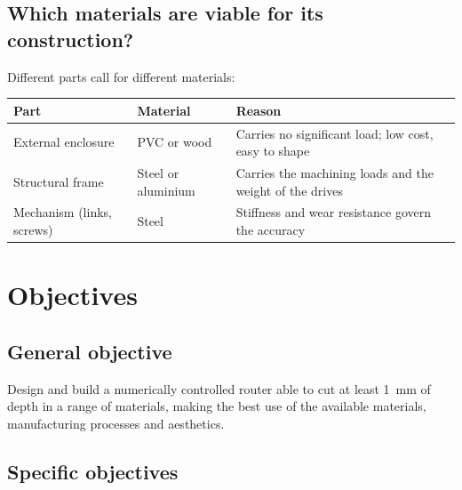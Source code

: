 \documentclass[11pt]{article}
\begin{document}
\subsection{Which materials are viable for its construction?}

Different parts call for different materials:

\begin{center}
\begin{tabular}{@{}l>{\raggedright\arraybackslash}p{4.0cm}>{\raggedright\arraybackslash}p{8.4cm}@{}}
\toprule
\textbf{Part} & \textbf{Material} & \textbf{Reason} \\
\midrule
External enclosure & PVC or wood & Carries no significant load; low cost, easy to shape \\
Structural frame   & Steel or aluminium & Carries the machining loads and the weight of the drives \\
Mechanism (links, screws) & Steel & Stiffness and wear resistance govern the accuracy \\
\bottomrule
\end{tabular}
\end{center}

\section{Objectives}

\subsection{General objective}

Design and build a numerically controlled router able to cut at least \SI{1}{\milli\metre}
of depth in a range of materials, making the best use of the available materials,
manufacturing processes and aesthetics.

\subsection{Specific objectives}
\end{document}
